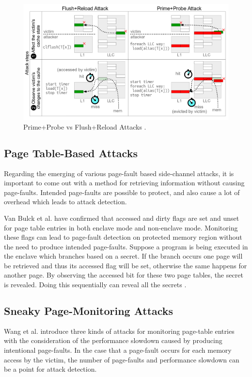 \begin{figure}
	\includegraphics[scale=0.28]{images/ppfr}
	\caption{Prime+Probe vs Flush+Reload Attacks \cite{kayaalp2016high}.}
	\label{fig:ppfr}
\end{figure}

\subsection{Page Table-Based Attacks}
Regarding the emerging of various page-fault based side-channel attacks, it is important to come out with a method for retrieving information without causing page-faults. Intended page-faults are possible to protect, and also cause a lot of overhead which leads to attack detection.

Van Bulck et al. \cite{stealthy} have confirmed that accessed and dirty flags are set and unset for page table entries in both enclave mode and non-enclave mode. Monitoring these flags can lead to page-fault detection on protected memory region without the need to produce intended page-faults. Suppose a program is being executed in the enclave which branches based on a secret. If the branch occurs one page will be retrieved and thus its accessed flag will be set, otherwise the same happens for another page. By observing the accessed bit for these two page tables, the secret is revealed. Doing this sequentially can reveal all the secrets \cite{stealthy}.


\subsection{Sneaky Page-Monitoring Attacks}
Wang et al. \cite{leakycauldron} introduce three kinds of attacks for monitoring page-table entries with the consideration of the performance slowdown caused by producing intentional page-faults. In the case that a page-fault occurs for each memory access by the victim, the number of page-faults and performance slowdown can be a point for attack detection.
